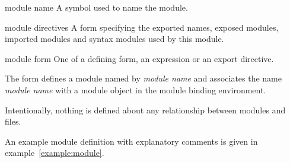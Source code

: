 \begin{optDefinition}
%
%
\begin{arguments}
    \item[module name] A symbol used to name the module.
    \item[module directives] A form specifying the exported names, exposed
    modules, imported modules and syntax modules used by this module.
    \item[module form] One of a defining form, an expression or an export
    directive.
\end{arguments}
%
\remarks%
The  form defines a module named by {\em module name}
and associates the name {\em module name} with a module object in the
module binding environment.
\begin{note}
    Intentionally, nothing is defined about any relationship between modules and
    files.
\end{note}
%
\examples
An example module definition with explanatory comments is given in
example~\ref{example:module}.
%
\end{optDefinition}
%
\label{directives}
%
